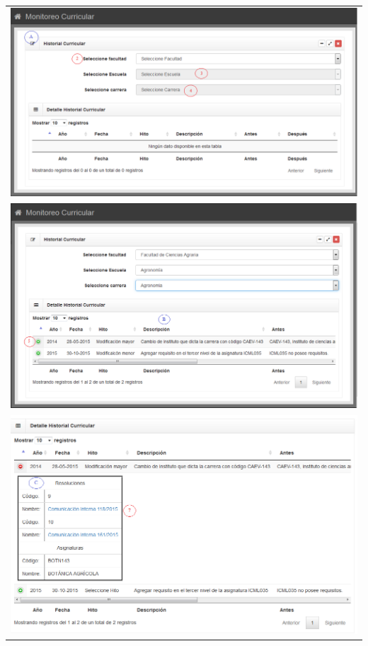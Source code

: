 \begin{longtable}{p{7cm}| p{7cm}}
			\multicolumn{2}{c}{\includegraphics[width=1\textwidth]{images/Capitulo_3/F_historialCurricular2.png}} \\ 
			
			\multicolumn{2}{c}{\includegraphics[width=1\textwidth]{images/Capitulo_3/F_historialCurricular3.png}} \\ 
			
			\multicolumn{2}{c}{\includegraphics[width=1\textwidth]{images/Capitulo_3/F_historialCurricular4.png}} \\ \hline
			

\end{longtable}
